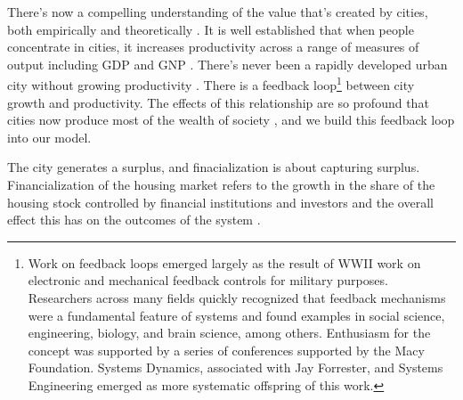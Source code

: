 There's now a compelling understanding of the value that's created by cities, both empirically and theoretically \cite{jacobsEconomyCities1969, spenceUrbanizationGrowth2009, bettencourtIntroductionUrbanScience2021}. 
 It is well established that when people concentrate in cities, it increases productivity across a range of measures of output including GDP and GNP \cite{bettencourtIntroductionUrbanScience2021}. There's never been a rapidly developed urban city without growing productivity \cite{annezUrbanizationGrowthSetting2009}.  %
 There is a feedback loop\footnote{Work on feedback loops emerged largely as the result of WWII work on electronic and mechanical feedback controls for military purposes. Researchers across many fields %
 quickly recognized that feedback mechanisms were a fundamental feature of systems and found examples in social science, engineering, biology, and brain science, among others. Enthusiasm for the concept was supported by a series of conferences supported by the Macy Foundation. %
 Systems Dynamics, associated with Jay Forrester, and Systems Engineering emerged as more systematic offspring of this work.} %
 between city growth and productivity. The effects of this relationship are so profound that cities now produce most of the wealth of society \cite{GET_cities-most-of-wealth}, and we build this feedback loop into our model.  

The city generates a surplus, and finacialization is about capturing surplus. Financialization of the housing market refers to the growth in the share of the housing stock controlled by financial institutions and investors and the overall effect this has on the outcomes of the system \cite{farhaReportFinancializationHousing2017, hansenFinanceCapitalismFinancialization2014}.%


